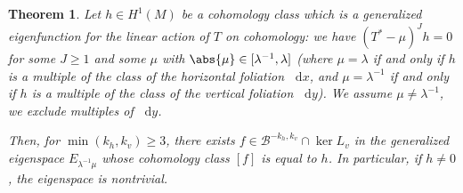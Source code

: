 \documentclass[JEP,XML,SOM,Unicode]{cedram}
\newcommand{\boB}{\mathcal{B}}
\newcommand{\dd}{\mathop{}\!\mathrm{d}}
\newtheorem{thm}{Theorem}[section]
\theoremstyle{definition}
\numberwithin{equation}{section}
\begin{document}
\begin{thm}
\label{thm:realise_H1} Let $h \in H^1(M)$ be a cohomology class which is a
generalized eigenfunction for the linear action of $T$ on cohomology: we have
$(T^* - \mu)^J h = 0$ for some $J\geq 1$ and some $\mu$ with $\abs{\mu}\in
[\lambda^{-1}, \lambda]$ (where $\mu = \lambda$ if and only if $h$ is a
multiple of the class of the horizontal foliation $\dd x$, and $\mu =
\lambda^{-1}$ if and only if $h$ is a multiple of the class of the vertical
foliation $\dd y$). We assume $\mu \neq \lambda^{-1}$, \ie we exclude
multiples of $\dd y$.

Then, for $\min(k_h, k_v) \geq 3$, there exists $f \in \boB^{-k_h, k_v} \cap
\ker L_v$ in the generalized eigenspace $E_{\lambda^{-1} \mu}$ whose
cohomology class $[f]$ is equal to $h$. In particular, if $h \neq 0$, the
eigenspace is nontrivial.
\end{thm}
\end{document}
